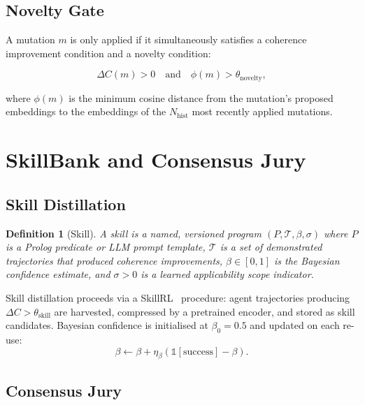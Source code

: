 \documentclass[11pt]{article}
\newtheorem{definition}{Definition}
\begin{document}
\subsection{Novelty Gate}

A mutation $m$ is only applied if it simultaneously satisfies a coherence
improvement condition and a novelty condition:

\begin{equation}
  \Delta C(m) > 0 \quad \text{and} \quad \phi(m) > \theta_{\text{novelty}},
\end{equation}

where $\phi(m)$ is the minimum cosine distance from the mutation's proposed
embeddings to the embeddings of the $N_{\text{hist}}$ most recently applied
mutations.

\section{SkillBank and Consensus Jury}
\nopagebreak[4]
\label{sec:skills}

\subsection{Skill Distillation}

\begin{definition}[Skill]
A \emph{skill} is a named, versioned program $(P, \mathcal{T}, \beta, \sigma)$
where $P$ is a Prolog predicate or LLM prompt template, $\mathcal{T}$ is a
set of demonstrated trajectories that produced coherence improvements,
$\beta \in [0,1]$ is the Bayesian confidence estimate, and $\sigma > 0$ is a
learned applicability scope indicator.
\end{definition}

Skill distillation proceeds via a SkillRL~\cite{skillrl2026} procedure: agent
trajectories producing $\Delta C > \theta_{\text{skill}}$ are harvested, compressed
by a pretrained encoder, and stored as skill candidates. Bayesian confidence is
initialised at $\beta_0 = 0.5$ and updated on each re-use:
\begin{equation}
  \beta \leftarrow \beta + \eta_\beta (\mathbb{1}[\text{success}] - \beta).
  \label{eq:bayesian_conf}
\end{equation}

\subsection{Consensus Jury}
\end{document}
